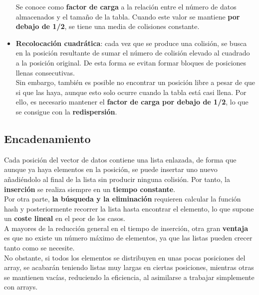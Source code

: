 \documentclass{article}
\begin{document}
\begin{itemize}
    Se conoce como \textbf{factor de carga} a la relación entre el número de datos almacenados y el tamaño de la tabla. Cuando este valor se mantiene \textbf{por debajo de 1/2}, se tiene una media de colisiones constante.


    \item \textbf{Recolocación cuadrática}: cada vez que se produce una colisión, se busca en la posición resultante de sumar el número de colisión elevado al cuadrado a la posición original. De esta forma se evitan formar bloques de posiciones llenas consecutivas. \\

    Sin embargo, también es posible no encontrar un posición libre a pesar de que si que las haya, aunque esto solo ocurre cuando la tabla está casi llena. Por ello, es necesario mantener el \textbf{factor de carga por debajo de 1/2}, lo que se consigue con la \textbf{redispersión}. \\
    
\end{itemize}

\subsection{Encadenamiento}
Cada posición del vector de datos contiene una lista enlazada, de forma que aunque ya haya elementos en la posición, se puede insertar uno nuevo añadiéndolo al final de la lista sin producir ninguna colisión. Por tanto, la \textbf{inserción} se realiza siempre en un \textbf{tiempo constante}. \\

Por otra parte, \textbf{la búsqueda y la eliminación} requieren calcular la función hash y posteriormente recorrer la lista hasta encontrar el elemento, lo que supone un \textbf{coste lineal} en el peor de los casos. \\

A mayores de la reducción general en el tiempo de inserción, otra gran \textbf{ventaja} es que no existe un número máximo de elementos, ya que las listas pueden crecer tanto como se necesite. \\

No obstante, si todos los elementos se distribuyen en unas pocas posiciones del array, se acabarán teniendo listas muy largas en ciertas posiciones, mientras otras se mantienen vacías, reduciendo la eficiencia, al asimilarse a trabajar simplemente con arrays. \\
\end{document}
